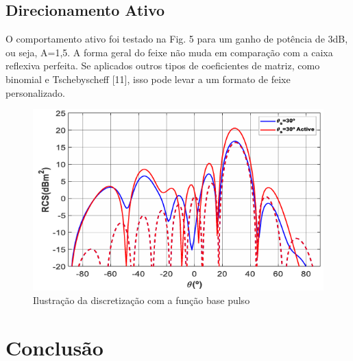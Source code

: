 \documentclass[
	12pt,				%
	openright,			%
	oneside,			%
	a4paper,			%
	english,			%
	brazil				%
	]{abntex2}
\begin{document}
\section{Direcionamento Ativo}

O comportamento ativo foi testado na Fig. 5 para um ganho de potência de 3dB, ou seja, A=1,5. A forma geral do feixe não muda em comparação com a caixa reflexiva perfeita. Se aplicados outros tipos de coeficientes de matriz, como binomial e Tschebyscheff [11], isso pode levar a um formato de feixe personalizado.
\begin{figure}[htb]
 \label{RCS10Active}
    \centering
    \caption{Ilustração da discretização  com a função base pulso} \label{fig_minipage}
    \includegraphics[width=\textwidth]{figures/ActiveRCS10.png}
  \hfill
\end{figure}
\chapter{Conclusão}

\lipsum[31-33]

\postextual


\end{document}
